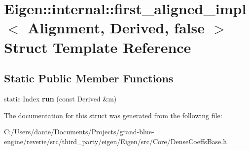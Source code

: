 \hypertarget{struct_eigen_1_1internal_1_1first__aligned__impl_3_01_alignment_00_01_derived_00_01false_01_4}{}\section{Eigen\+::internal\+::first\+\_\+aligned\+\_\+impl$<$ Alignment, Derived, false $>$ Struct Template Reference}
\label{struct_eigen_1_1internal_1_1first__aligned__impl_3_01_alignment_00_01_derived_00_01false_01_4}
\subsection*{Static Public Member Functions}
\begin{DoxyCompactItemize}
\item 
\mbox{\label{struct_eigen_1_1internal_1_1first__aligned__impl_3_01_alignment_00_01_derived_00_01false_01_4_a6bcfd273a6d60345207910363afddf1b}} 
static Index {\bfseries run} (const Derived \&m)
\end{DoxyCompactItemize}


The documentation for this struct was generated from the following file\+:\begin{DoxyCompactItemize}
\item 
C\+:/\+Users/dante/\+Documents/\+Projects/grand-\/blue-\/engine/reverie/src/third\+\_\+party/eigen/\+Eigen/src/\+Core/Dense\+Coeffs\+Base.\+h\end{DoxyCompactItemize}
